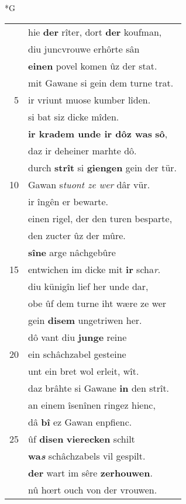\documentclass[8pt,a4paper,notitlepage]{article}
\begin{document}
\begin{table}[ht]
\begin{minipage}[t]{0.5\linewidth}
\small
\begin{center}*G
\end{center}
\begin{tabular}{rl}
 & hie \textbf{der} rîter, dort \textbf{der} koufman,\\ 
 & diu juncvrouwe erhôrte sân\\ 
 & \textbf{einen} povel komen ûz der stat.\\ 
 & mit Gawane si gein dem turne trat.\\ 
5 & ir vriunt muose kumber lîden.\\ 
 & si bat siz dicke mîden.\\ 
 & \textbf{ir kradem unde ir dôz was} \textbf{sô},\\ 
 & daz ir deheiner marhte dô.\\ 
 & durch \textbf{strît} si \textbf{giengen} gein der tür.\\ 
10 & Gawan s\textit{tuont ze wer} dâr vür.\\ 
 & ir îngên er bewarte.\\ 
 & einen rigel, der den turen besparte,\\ 
 & den zucter ûz der mûre.\\ 
 & \textbf{sîne} arge nâchgebûre\\ 
15 & entwichen im dicke mit \textbf{ir} scha\textit{r}.\\ 
 & diu künigîn lief her unde dar,\\ 
 & obe ûf dem turne iht wære ze wer\\ 
 & gein \textbf{disem} ungetriwen her.\\ 
 & dô vant diu \textbf{junge} reine\\ 
20 & ein schâchzabel gesteine\\ 
 & unt ein bret wol erleit, wît.\\ 
 & daz brâhte si Gawane \textbf{in} den strît.\\ 
 & an einem îsenînen ringez hienc,\\ 
 & dâ \textbf{bî} ez Gawan enpfienc.\\ 
25 & ûf \textbf{disen} \textbf{vierecken} schilt\\ 
 & \textbf{wa\textit{s}} schâchzabels vil gespilt.\\ 
 & \textbf{der} wart im sêre \textbf{zerhouwen}.\\ 
 & nû hœrt ouch von der vrouwen.\\ 

\end{tabular}
\end{minipage}
\end{table}
\end{document}
